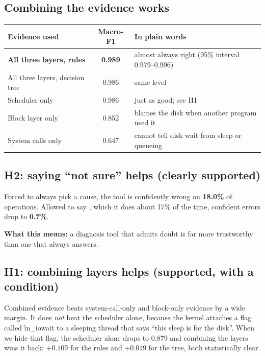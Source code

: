 \documentclass[11pt]{article}
\begin{document}
\subsection{Combining the evidence works}

\begin{center}
\begin{tabular}{@{}lcl@{}}
\toprule
Evidence used & Macro-F1 & In plain words \\
\midrule
\textbf{All three layers, rules} & \textbf{0.989} & almost always right (95\% interval 0.979--0.996) \\
All three layers, decision tree & 0.986 & same level \\
Scheduler only & 0.986 & just as good; see H1 \\
Block layer only & 0.852 & blames the disk when another program used it \\
System calls only & 0.647 & cannot tell disk wait from sleep or queueing \\
\bottomrule
\end{tabular}
\end{center}

\subsection{H2: saying ``not sure'' helps (clearly supported)}
Forced to always pick a cause, the tool is confidently wrong on \textbf{18.0\%} of operations. Allowed to say \IND, which it does about 17\% of the time, confident errors drop to \textbf{0.7\%}.

\begin{means}\textbf{What this means:} a diagnosis tool that admits doubt is far more trustworthy than one that always answers.\end{means}

\subsection{H1: combining layers helps (supported, with a condition)}
Combined evidence beats system-call-only and block-only evidence by a wide margin. It does \emph{not} beat the scheduler alone, because the kernel attaches a flag called \f{in\_iowait} to a sleeping thread that says ``this sleep is for the disk''. When we hide that flag, the scheduler alone drops to 0.879 and combining the layers wins it back: $+0.109$ for the rules and $+0.019$ for the tree, both statistically clear.
\end{document}
